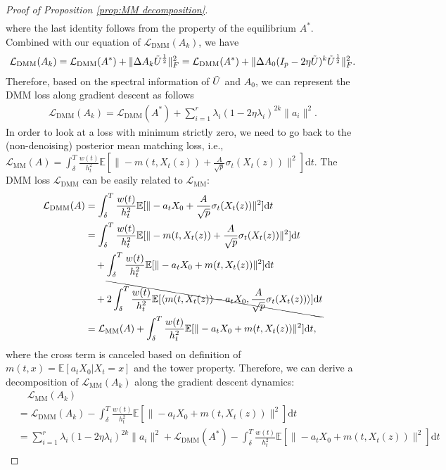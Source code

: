 \documentclass[11pt]{article}
\newcommand{\mb}{\mathbb}
\newcommand{\dee}{\mathrm{d}}
\newcommand{\mc}{\mathcal}
\newcommand{\DMM}{\mc{L}_{\mathrm{DMM}}}
\begin{document}
\begin{proof}[Proof of Proposition \ref{prop:MM decomposition}]
\begin{align*}
\end{align*}
where the last identity follows from the property of the equilibrium $A^*$. Combined with our equation of $\DMM(A_k)$, we have
\begin{align*}
    \DMM(A_k) = \DMM(A^*) + \|\Delta A_k\Tilde{U}^{\frac{1}{2}}\|_F^2 =  \DMM(A^*) + \|\Delta A_0 (I_p-2\eta \Tilde{U})^k \Tilde{U}^{\frac{1}{2}}\|_F^2.
\end{align*}
Therefore, based on the spectral information of $\Tilde{U}$ and $A_0$, we can represent the DMM loss along gradient descent as follows
\begin{align}\label{eq:loss decomposition}
    \DMM(A_k) = \DMM(A^*) + \sum_{i=1}^r \lambda_i (1-2\eta \lambda_i)^{2k}\| a_i \|^2 .
\end{align}
In order to look at a loss with minimum strictly zero, we need to go back to the (non-denoising) posterior mean matching loss, i.e., $\mc{L}_{\mathrm{MM}}(A)=\int_\delta^T \frac{w(t)}{h_t^2}\mb{E}[  \| - m(t,X_t(z)) + \frac{A}{\sqrt{p}}\sigma_t(X_t(z)) \|^2 ] \dee t $. The DMM loss $\DMM$ can be easily related to $\mc{L}_{\mathrm{MM}}$:
\begin{align*}
    \DMM(A) & = \int_\delta^T \frac{w(t)}{h_t^2}\mb{E}[  \| -a_t X_0 + \frac{A}{\sqrt{p}}\sigma_t(X_t(z)) \|^2 ] \dee t \\
    & = \int_\delta^T \frac{w(t)}{h_t^2}\mb{E}[  \| -m(t,X_t(z)) + \frac{A}{\sqrt{p}}\sigma_t(X_t(z)) \|^2 ] \dee t \\
    &\quad + \int_\delta^T \frac{w(t)}{h_t^2}\mb{E}[  \| -a_t X_0 + m(t,X_t(z)) \|^2 ] \dee t \\
    &\quad + \bcancel{2\int_\delta^T \frac{w(t)}{h_t^2}\mb{E}[  \langle m(t,X_t(z))-a_t X_0 , \frac{A}{\sqrt{p}}\sigma_t(X_t(z)) \rangle ] \dee t} \\
    & = \mc{L}_{\mathrm{MM}}(A) + \int_\delta^T \frac{w(t)}{h_t^2}\mb{E}[  \| -a_t X_0 + m(t,X_t(z)) \|^2 ] \dee t,
\end{align*}
where the cross term is canceled based on definition of $m(t,x)=\mb{E}[a_t X_0|X_t=x]$ and the tower property. Therefore, we can derive a decomposition of $\mc{L}_{\mathrm{MM}}(A_k)$ along the gradient descent dynamics:
\begin{align}\label{eq:error decomposition}
    &\quad\mc{L}_{\mathrm{MM}}(A_k) \\
    & = \DMM(A_k) - \int_\delta^T \frac{w(t)}{h_t^2}\mb{E}[  \| -a_t X_0 + m(t,X_t(z)) \|^2 ] \dee t \nonumber\\
    & =  \sum_{i=1}^r \lambda_i (1-2\eta \lambda_i)^{2k}\| a_i \|^2 +  \DMM(A^*) - \int_\delta^T \frac{w(t)}{h_t^2}\mb{E}[  \| -a_t X_0 + m(t,X_t(z)) \|^2 ] \dee t \nonumber \\

\end{align}
\end{proof}
\end{document}
